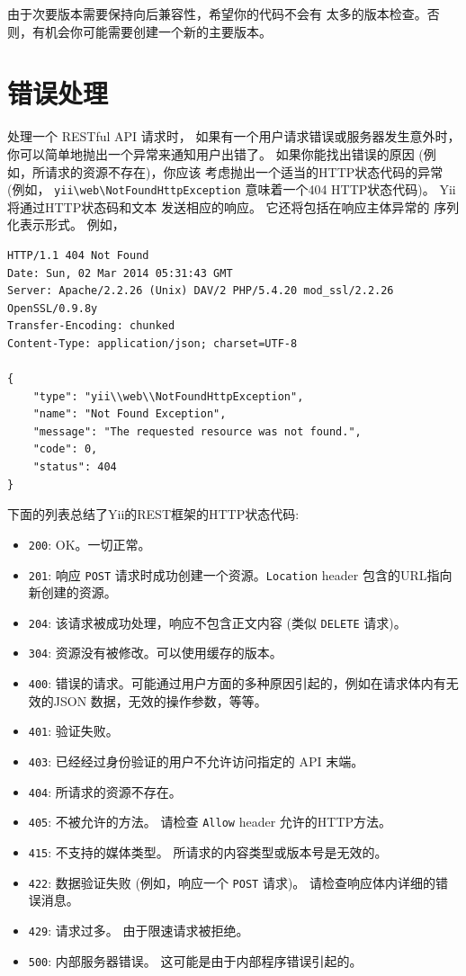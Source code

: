 由于次要版本需要保持向后兼容性，希望你的代码不会有
太多的版本检查。否则，有机会你可能需要创建一个新的主要版本。



\label{rest-error-handling.md}\section{错误处理}
处理一个 RESTful API 请求时， 如果有一个用户请求错误或服务器发生意外时， 你可以简单地抛出一个异常来通知用户出错了。
如果你能找出错误的原因 (例如，所请求的资源不存在)，你应该
考虑抛出一个适当的HTTP状态代码的异常 (例如， \texttt{yii{\allowbreak{}\textbackslash}web{\allowbreak{}\textbackslash}NotFoundHttpException}
意味着一个404 HTTP状态代码)。 Yii 将通过HTTP状态码和文本
发送相应的响应。 它还将包括在响应主体异常的
序列化表示形式。 例如，

\begin{lstlisting}
HTTP/1.1 404 Not Found
Date: Sun, 02 Mar 2014 05:31:43 GMT
Server: Apache/2.2.26 (Unix) DAV/2 PHP/5.4.20 mod_ssl/2.2.26 OpenSSL/0.9.8y
Transfer-Encoding: chunked
Content-Type: application/json; charset=UTF-8

{
    "type": "yii\\web\\NotFoundHttpException",
    "name": "Not Found Exception",
    "message": "The requested resource was not found.",
    "code": 0,
    "status": 404
}
\end{lstlisting}
下面的列表总结了Yii的REST框架的HTTP状态代码:

\begin{itemize}
\item \lstinline|200|: OK。一切正常。
\item \lstinline|201|: 响应 \lstinline|POST| 请求时成功创建一个资源。\lstinline|Location| header
 包含的URL指向新创建的资源。
\item \lstinline|204|: 该请求被成功处理，响应不包含正文内容 (类似 \lstinline|DELETE| 请求)。
\item \lstinline|304|: 资源没有被修改。可以使用缓存的版本。
\item \lstinline|400|: 错误的请求。可能通过用户方面的多种原因引起的，例如在请求体内有无效的JSON
 数据，无效的操作参数，等等。
\item \lstinline|401|: 验证失败。
\item \lstinline|403|: 已经经过身份验证的用户不允许访问指定的 API 末端。
\item \lstinline|404|: 所请求的资源不存在。
\item \lstinline|405|: 不被允许的方法。 请检查 \lstinline|Allow| header 允许的HTTP方法。
\item \lstinline|415|: 不支持的媒体类型。 所请求的内容类型或版本号是无效的。
\item \lstinline|422|: 数据验证失败 (例如，响应一个 \lstinline|POST| 请求)。 请检查响应体内详细的错误消息。
\item \lstinline|429|: 请求过多。 由于限速请求被拒绝。
\item \lstinline|500|: 内部服务器错误。 这可能是由于内部程序错误引起的。
\end{itemize}


